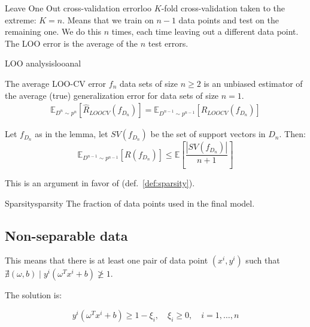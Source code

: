 \begin{definition}{Leave One Out cross-validation error}{loo}
	$K$-fold cross-validation taken to the extreme: $K=n$.
	Means that we train on $n-1$ data points and test on the remaining one.
	We do this $n$ times, each time leaving out a different data point.
	The LOO error is the average of the $n$ test errors.
\end{definition}

\begin{theorem}{LOO analysis}{looanal}
	\begin{lemma}{}{}
			The average LOO-CV error $f_n$ data sets of size $n \geq 2$
			is an unbiased estimator of the average (true) generalization
			error for data sets of size $n=1$.
		\begin{align*}
			\mathds{E}_{D^n \sim p^n}
			\left[ \hat{R}_{LOOCV}(f_{D_n}) \right] =
			\mathds{E}_{D^{n-1} \sim p^{n-1}} \left[{R_{LOOCV}(f_{D_n})} \right]
		\end{align*}
	\end{lemma}
	Let $f_{D_n}$ as in the lemma, let $SV(f_{D_n})$ be the set of
	support vectors in $D_n$. Then:
	\begin{equation*}
		\mathds{E}_{D^{n-1} \sim p^{n-1}} \left[{R(f_{D_n})} \right]
		\leq \mathds{E} \left[
			\frac{\left| SV(f_{D_n}) \right|}{n + 1}
			\right]
	\end{equation*}
  \tcblower
  \begin{note}
	  This is an argument in favor of  (def.~\ref{def:sparsity}).
  \end{note}
\end{theorem}

\begin{definition}{Sparsity}{sparsity}
	The fraction of data points used in the final model.
\end{definition}

\subsection*{Non-separable data}

This means that there is at least one pair of data point $(x^i, y^i)$
such that $\nexists (\omega, b) \mid y^i (\omega^T x^i + b) \ngeq 1$.

The solution is:

\begin{equation*}
	y^i (\omega^T x^i + b) \geq 1 - \xi_i, \quad \xi_i \geq 0,\quad
	i=1,\dots,n
\end{equation*}

